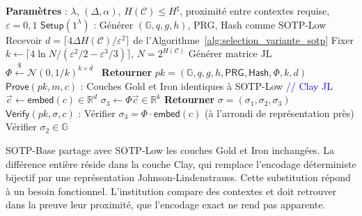 \begin{sloppypar}
\begin{algorithm}[H]
\caption{Construction de SOTP-Base avec repr\'esentation JL}
\label{alg:sotp_base}
\begin{algorithmic}[1]
\State \textbf{Param\`etres} : $\lambda$, $(\Delta, \alpha)$, $H(\mathcal{C}) \leq H^\sharp$, proximit\'e entre contextes requise, $\varepsilon = 0{,}1$
\State \textbf{$\mathsf{Setup}(1^\lambda)$} :
\State \quad G\'en\'erer $(\mathbb{G}, q, g, h)$, PRG, Hash comme SOTP-Low
\State \quad Recevoir $d = \lceil 4\Delta H(\mathcal{C})/\varepsilon^2 \rceil$ de l'Algorithme~\ref{alg:selection_variante_sotp}
\State \quad Fixer $k \leftarrow \lceil 4\ln N/(\varepsilon^2/2 - \varepsilon^3/3) \rceil$, $N = 2^{H(\mathcal{C})}$
\State \quad G\'en\'erer matrice JL $\Phi \xleftarrow{\$} \mathcal{N}(0, 1/k)^{k \times d}$~\cite{DasguptaGupta03,Vempala05}
\State \quad \textbf{Retourner} $pk = (\mathbb{G}, q, g, h, \mathsf{PRG}, \mathsf{Hash}, \Phi, k, d)$
\State \textbf{$\mathsf{Prove}(pk, m, c)$} :
\State \quad Couches Gold et Iron identiques \`a SOTP-Low
\State \quad \textcolor{blue}{// Clay JL}
\State \quad $\vec{c} \leftarrow \mathsf{embed}(c) \in \mathbb{R}^d$
\State \quad $\sigma_3 \leftarrow \Phi \vec{c} \in \mathbb{R}^k$
\State \quad \textbf{Retourner} $\sigma = (\sigma_1, \sigma_2, \sigma_3)$
\State \textbf{$\mathsf{Verify}(pk, \sigma, c)$} :
\State \quad V\'erifier $\sigma_3 = \Phi \cdot \mathsf{embed}(c)$ (\`a l'arrondi de repr\'esentation pr\`es)
\State \quad V\'erifier $\sigma_2 \in \mathbb{G}$
\end{algorithmic}
\end{algorithm}

SOTP-Base partage avec SOTP-Low les couches Gold et Iron inchang\'ees.
La diff\'erence enti\`ere r\'eside dans la couche Clay, qui remplace
l'encodage d\'eterministe bijectif par une repr\'esentation
Johnson-Lindenstrauss. Cette substitution r\'epond \`a un besoin fonctionnel.
L'institution compare des contextes et doit retrouver dans la preuve leur
proximit\'e, que l'encodage exact ne rend pas apparente.


\end{sloppypar}
